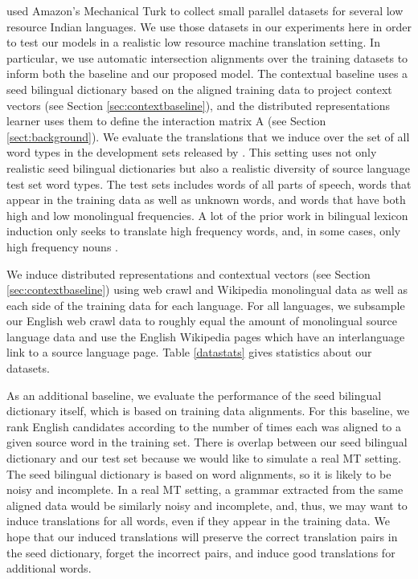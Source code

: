 \documentclass[11pt]{article}
\begin{document}
 used Amazon's Mechanical Turk to collect small parallel datasets for several low resource Indian languages. 
We use those datasets in our experiments here in order to test our models in a realistic low resource machine translation setting.
In particular, we use automatic intersection alignments over the training datasets to inform both the baseline and our proposed model. %
The contextual baseline uses a seed bilingual dictionary based on the aligned training data to project context vectors (see Section \ref{sec:contextbaseline}), and the distributed representations learner uses them to define the interaction matrix A (see Section \ref{sect:background}).
We evaluate the translations that we induce over the set of all word types in the development sets released by .
This setting uses not only realistic seed bilingual dictionaries but also a realistic diversity of source language test set word types.
The test sets includes words of all parts of speech, words that appear in the training data as well as unknown words, and words that have both high and low monolingual frequencies.
A lot of the prior work in bilingual lexicon induction only seeks to translate high frequency words, and, in some cases, only high frequency nouns \cite{koehn02,haghighi08}.

We induce distributed representations and contextual vectors (see Section \ref{sec:contextbaseline}) using web crawl and Wikipedia monolingual data as well as each side of the training data for each language.
For all languages, we subsample our English web crawl data to roughly equal the amount of monolingual source language data and use the English Wikipedia pages which have an interlanguage link to a source language page.
Table \ref{datastats} gives statistics about our datasets.

As an additional baseline, we evaluate the performance of the seed bilingual dictionary itself, which is based on training data alignments.
For this baseline, we rank English candidates according to the number of times each was aligned to a given source word in the training set.
There is overlap between our seed bilingual dictionary and our test set because we would like to simulate a real MT setting.
The seed bilingual dictionary is based on word alignments, so it is likely to be noisy and incomplete. 
In a real MT setting, a grammar extracted from the same aligned data would be similarly noisy and incomplete, and, thus, we may want to induce translations for all words, even if they appear in the training data.
We hope that our induced translations will preserve the correct translation pairs in the seed dictionary, forget the incorrect pairs, and induce good translations for additional words.
\end{document}
